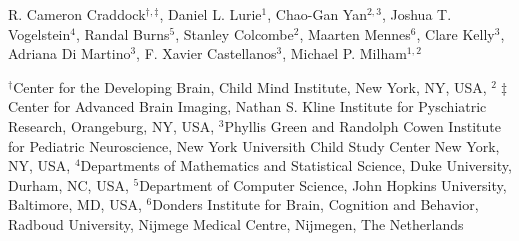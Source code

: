 R. Cameron Craddock$^{\dagger,\ddagger}$,
Daniel L. Lurie$^1$, 
Chao-Gan Yan$^{2,3}$,
Joshua T. Vogelstein$^4$,
Randal Burns$^5$,
Stanley Colcombe$^2$,
Maarten Mennes$^6$,
Clare Kelly$^3$,
Adriana Di Martino$^3$,
F. Xavier Castellanos$^3$,
Michael P. Milham$^{1,2}$



$^\dagger${Center for the Developing Brain, Child Mind Institute, New York, NY, USA},
$^2\ddagger${Center for Advanced Brain Imaging, Nathan S. Kline Institute for Pyschiatric Research, Orangeburg, NY, USA},
$^3${Phyllis Green and Randolph Cowen Institute for Pediatric Neuroscience, New York Universith Child Study Center New York, NY, USA},
$^4${Departments of Mathematics and Statistical Science, Duke University, Durham, NC, USA},
$^5${Department of Computer Science, John Hopkins University, Baltimore, MD, USA},
$^6${Donders Institute for Brain, Cognition and Behavior, Radboud University, Nijmege Medical Centre, Nijmegen, The Netherlands}

